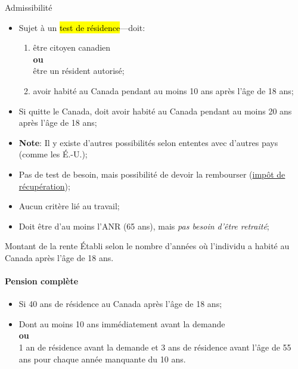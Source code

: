 \documentclass[10pt, french]{article}
\begin{document}
\begin{multicols*}{3}
\begin{conceptgen}{Admissibilité}
\begin{itemize}[leftmargin = *]
	\item	Sujet à un \hl{test de résidence}---doit: 
		\begin{enumerate}[leftmargin = *]
		\item	être citoyen canadien \\
					\textbf{ou}\\
				être un résident autorisé;
		\item	avoir habité au Canada pendant au moins 10 ans après l'âge de 18 ans;
		\end{enumerate}
	\item	Si quitte le Canada, doit avoir habité au Canada pendant au moins 20 ans après l'âge de 18 ans;
	\item[]	\textbf{Note}: Il y existe d'autres possibilités selon ententes avec d'autres pays (comme les É.-U.);
	\item	Pas de test de besoin, mais possibilité de devoir la rembourser (\hypertarget{recup_tx_l8r1}{\hyperlink{recup_tx_explain}{\textcolor{blue_rectangle}{impôt de récupération}}});
	\item   Aucun critère lié au travail;
	\item	Doit être d'au moins l'ANR (65 ans), mais \textit{pas besoin d'être retraité};
\end{itemize}
\end{conceptgen}

\begin{conceptgen}{Montant de la rente}
Établi selon le nombre d'années où l'individu a habité au Canada après l'âge de 18 ans.

\paragraph*{Pension complète}
\begin{itemize}[leftmargin = *]
	\item	Si 40 ans de résidence au Canada après l'âge de 18 ans;
	\item	Dont au moins 10 ans immédiatement avant la demande \\
				\textbf{ou} 	\\
			1 an de résidence avant la demande et 3 ans de résidence avant l'âge de 55 ans pour chaque année manquante du 10 ans.
\end{itemize}


\end{conceptgen}
\end{multicols*}
\end{document}
